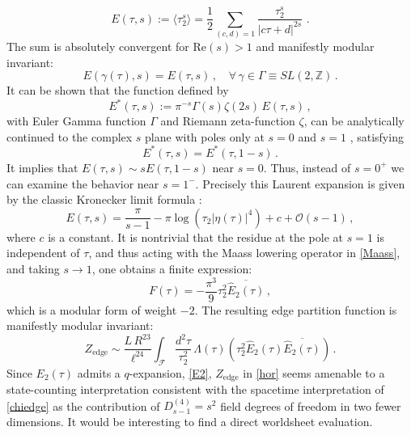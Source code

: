 \documentclass[aps,prl, reprint, superscriptaddress, 10pt]{revtex4-2}
\newcommand{\1}{\textbf{1}}
\renewcommand{\Re}{\mbox{Re}}
\newcommand{\+}{{\,+ \,}}
\begin{document}
 \begin{equation}
	E\left( \tau, s \right) := \langle\tau_2^s\rangle = \frac{1}{2}
	\sum_{(c,d)=1}\dfrac{\tau _{2}^{s}}{| c\tau+d| ^{2s}} \,
	\, .
\end{equation}
The sum is absolutely convergent for $\Re (s) > 1 $ and manifestly modular invariant:
\begin{equation}
	E\left( \gamma ( \tau ), s \right) = E\left( \tau , s \right) \, , \quad \forall \,\gamma \in \Gamma \equiv SL\left( 2,\mathbb{Z} \right) \, .
\end{equation}
It can be shown that the function defined by
\begin{equation}
	E^*\left( \tau, s \right) := \pi ^{-s}\Gamma\left(s \right) \zeta \left( 2s \right) \, E\left( \tau, s \right) \, ,
\end{equation}
with Euler Gamma function $\Gamma$ and Riemann zeta-function $\zeta$, can be analytically continued to the complex $s$ plane with poles only at $s=0$ and $s=1$ \cite{Zagier:1981}, satisfying
\begin{equation}
	E^*\left( \tau ,s\right) =E^*\left( \tau ,1-s\right) \, .
\end{equation}
It implies that $E(\tau, s) \sim s E(\tau, 1-s) $ near $s=0$. Thus, instead of $s= 0^+$ we can examine the behavior near $s=1^-$. Precisely this Laurent expansion is given by the classic Kronecker limit formula \cite{Lang1987}:
\begin{equation}\label{Kronecker}
	E(\tau, s) = \frac{\pi}{s-1} - \pi\log (\tau_2 |\eta(\tau)|^4) + c + \mathcal{O}(s-1) \, ,
\end{equation}
where $c$ is a constant. It is nontrivial that the residue at the pole at $s=1$ is independent of $\tau$, and thus acting with the Maass lowering operator in \eqref{Maass}, and taking $s \rightarrow 1$, one obtains a finite expression:
\begin{equation}
	F(\tau) = - \frac{\pi^3}{9}\tau_2^2 \overline{\hat{E}_2(\tau)} \, ,
\end{equation}
which is a modular form of weight $-2$. The resulting edge partition function is manifestly modular invariant:
\begin{equation}\label{hor}
	Z_{\text{edge}} \sim \frac{L\,R^{23}}{ \ell^{ 24} } \int_{\mathcal{F}} \frac{d^2\tau}{\tau_2^2}\, \Lambda (\tau) \left(\tau_2^2 \hat E_2(\tau) \overline{ \hat E_2(\tau) }\right) \, .
\end{equation}
Since $E_2 (\tau)$ admits a $q$-expansion, \eqref{E2}, $Z_{\text{edge}}$ in \eqref{hor} seems amenable to a state-counting interpretation consistent with the spacetime interpretation of \eqref{chiedge} as the contribution of $D^{(4)}_{s-1}=s^2$ field degrees of freedom in two fewer dimensions. It would be interesting to find a direct worldsheet evaluation.
\end{document}
